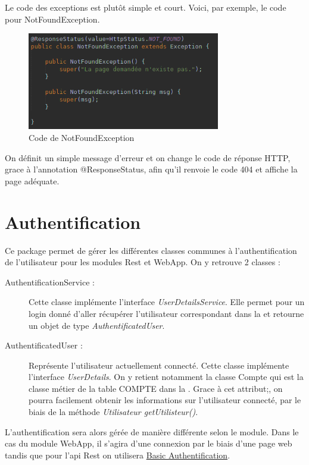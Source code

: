 		Le code des exceptions est plutôt simple et court. Voici, par exemple, le code pour NotFoundException.

		\begin{figure}[H]
			\centering\includegraphics[width=0.75\textwidth, keepaspectratio]{res/NotFoundException.png}
			\caption{Code de NotFoundException}
		\end{figure}

		On définit un simple message d'erreur et on change le code de réponse HTTP, grace à l'annotation @ResponseStatus, afin qu'il renvoie le code 404 et affiche la page adéquate.

	\section{Authentification}
		\label{sec:core_authentification}

		Ce package permet de gérer les différentes classes communes à l'authentification de l'utilisateur pour les modules Rest et WebApp. On y retrouve 2 classes :

		\begin{description}
		   \item[AuthentificationService :]{Cette classe implémente l'interface \textit{UserDetailsService}. Elle permet pour un login donné d'aller récupérer l'utilisateur correspondant dans la \bdd{} et retourne un objet de type \textit{AuthentificatedUser}.}
		   \item[AuthentificatedUser :]{Représente l'utilisateur actuellement connecté. Cette classe implémente l'interface \textit{UserDetails}. On y retient notamment la classe Compte qui est la classe métier de la table COMPTE dans la \bdd{}. Grace à cet attribut;, on pourra facilement obtenir les informations sur l'utilisateur connecté, par le biais de la méthode \textit{Utilisateur getUtilisteur()}.}
	   \end{description}

	   L'authentification sera alors gérée de manière différente selon le module. Dans le cas du module WebApp, il s'agira d'une connexion par le biais d'une page web tandis que pour l'api Rest on utilisera \href{https://fr.wikipedia.org/wiki/Authentification\_HTTP#M%C3%A9thode\_%C2%AB\_Basic\_%C2%BB}{Basic Authentification}.

